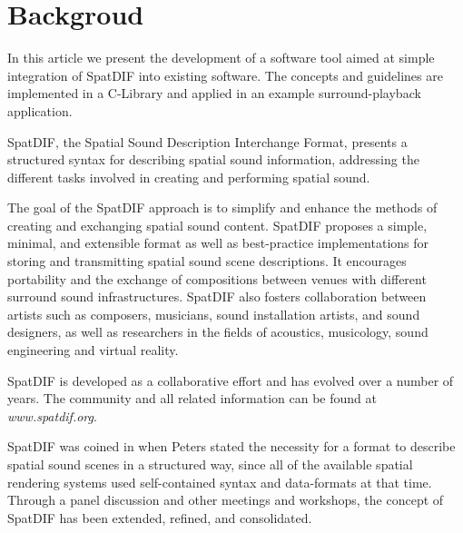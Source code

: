\documentclass{article}
\title{\papertitle}
\begin{document}
%
\capstartfalse
\maketitle
\capstarttrue
%
\begin{abstract}
The development and specification of SpatDIF, the spatial sound descriptor interchange format, is complemented with an actual software implementation in order to become usable in various environments. 
In this report, the current state in the development of a software library called `SpatDIFlib' is discussed.
The design principles derived from the concepts and specifications of SpatDIF, the class structure of the library, and code demonstrating its usage is presented.
Furthermore, an application that utilizes the library is introduced as an exemplary use case.
\end{abstract}
%
\section{Backgroud}

In this article we present the development of a software tool aimed at simple integration of SpatDIF into existing software.
The concepts and guidelines are implemented in a C-Library and applied in an example surround-playback application.

SpatDIF, the Spatial Sound Description Interchange Format, presents a structured syntax for describing spatial sound information, addressing the different tasks involved in creating and performing spatial sound.

The goal of the SpatDIF approach is to simplify and enhance the methods of creating and exchanging spatial sound content. 
SpatDIF proposes a simple, minimal, and extensible format as well as best-practice implementations for storing and transmitting spatial sound scene descriptions. 
It encourages portability and the exchange of compositions between venues with different surround sound infrastructures. 
SpatDIF also fosters collaboration between artists such as composers, musicians, sound installation artists, and sound designers, as well as researchers in the fields of acoustics, musicology, sound engineering and virtual reality.

SpatDIF is developed as a collaborative effort and has evolved over a number of years. 
The community and all related information can be found at {\it www.spatdif.org}.

SpatDIF was coined in \citeyear{peters_caa07} \cite{peters_caa07} when Peters stated the necessity for a format to describe spatial sound scenes in a structured way, since all of the available spatial rendering systems used self-contained syntax and data-formats at that time. 
Through a panel discussion \cite{2008ICMCpanel, Peters:2008spatdif} and other meetings and workshops, the concept of SpatDIF has been extended, refined, and consolidated. 
\end{document}
